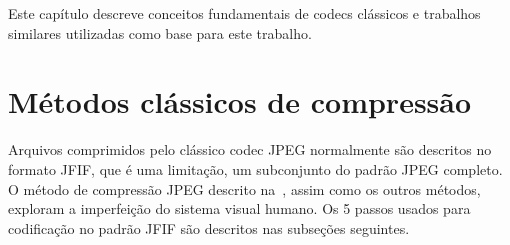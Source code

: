 \newcommand{\texCommand}[1]{\texttt{\textbackslash{#1}}}%

\newcommand{\exemplo}[1]{%
\vspace{\baselineskip}%
\noindent\fbox{\begin{minipage}{\textwidth}#1\end{minipage}}%
\\\vspace{\baselineskip}}%

\newcommand{\exemploVerbatim}[1]{%
\vspace{\baselineskip}%
\noindent\fbox{\begin{minipage}{\textwidth}%
#1\end{minipage}}%
\\\vspace{\baselineskip}}%

Este capítulo descreve conceitos fundamentais de codecs clássicos e trabalhos similares utilizadas como base para este trabalho.
\section{Métodos clássicos de compressão}
Arquivos comprimidos pelo clássico codec JPEG normalmente são descritos no formato \acrshort{JFIF}, que é uma limitação, um subconjunto do padrão JPEG completo. 
O método de compressão JPEG descrito na~, assim como os outros métodos, exploram a 
imperfeição do sistema visual humano. Os 5 passos usados para codificação no padrão JFIF são descritos nas subseções seguintes.
